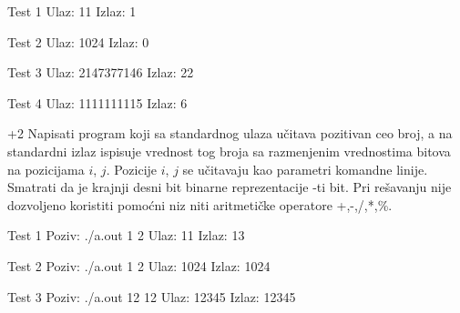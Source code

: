 \begin{Exercise}[label=004]
\begin{Exercise}[label=208]
\begin{minitest}
\begin{test}{Test 1}
Ulaz:   11  
Izlaz:  1    
\end{test}
\end{minitest}
\begin{minitest}
\begin{test}{Test 2}
Ulaz:   1024
Izlaz:  0 
\end{test}
\end{minitest}
\begin{minitest}
\begin{test}{Test 3}
Ulaz:   2147377146
Izlaz:  22
\end{test}
\end{minitest}

\begin{minitest}
\begin{test}{Test 4}
Ulaz:   1111111115
Izlaz:  6 
\end{test}
\end{minitest}

\end{Exercise}
\begin{Answer}[ref=208]
\end{Answer}


\begin{Exercise}[label=209]\marker+{2}
Napisati program koji sa standardnog ulaza učitava pozitivan
  ceo broj, a na standardni izlaz ispisuje vrednost tog broja sa
  razmenjenim vrednostima bitova na pozicijama $i$,
  $j$. Pozicije $i$, $j$ se učitavaju kao parametri
  komandne linije. Smatrati da je krajnji desni bit binarne
  reprezentacije -ti bit. Pri rešavanju nije dozvoljeno koristiti
  pomoćni niz niti aritmetičke operatore +,-,/,*,\%.

\begin{minitest}
\begin{test}{Test 1}
Poziv:  ./a.out 1 2 
Ulaz:   11             
Izlaz:  13            
\end{test}
\end{minitest}
\begin{minitest}
\begin{test}{Test 2}
Poziv: ./a.out 1 2
Ulaz:   1024     
Izlaz:  1024        
\end{test}
\end{minitest}
\begin{minitest}
\begin{test}{Test 3}
Poziv: ./a.out 12 12
Ulaz:   12345
Izlaz:  12345
\end{test}
\end{minitest}
\end{Exercise}
\begin{Answer}[ref=209]
\end{Answer}


\end{Exercise}
